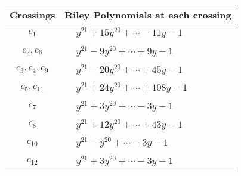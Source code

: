\documentclass[1p]{elsarticle_modified}
\theoremstyle{definition}
\begin{document}
\begin{tabular}{m{50pt}|m{274pt}}
Crossings & \hspace{64pt}Riley Polynomials at each crossing \\
\hline $$\begin{aligned}c_{1}\end{aligned}$$&$\begin{aligned}
&y^{21}+15 y^{20}+\cdots-11 y-1
\end{aligned}$\\
\hline $$\begin{aligned}c_{2},c_{6}\end{aligned}$$&$\begin{aligned}
&y^{21}-9 y^{20}+\cdots+9 y-1
\end{aligned}$\\
\hline $$\begin{aligned}c_{3},c_{4},c_{9}\end{aligned}$$&$\begin{aligned}
&y^{21}-20 y^{20}+\cdots+45 y-1
\end{aligned}$\\
\hline $$\begin{aligned}c_{5},c_{11}\end{aligned}$$&$\begin{aligned}
&y^{21}+24 y^{20}+\cdots+108 y-1
\end{aligned}$\\
\hline $$\begin{aligned}c_{7}\end{aligned}$$&$\begin{aligned}
&y^{21}+3 y^{20}+\cdots-3 y-1
\end{aligned}$\\
\hline $$\begin{aligned}c_{8}\end{aligned}$$&$\begin{aligned}
&y^{21}+12 y^{20}+\cdots+43 y-1
\end{aligned}$\\
\hline $$\begin{aligned}c_{10}\end{aligned}$$&$\begin{aligned}
&y^{21}- y^{20}+\cdots-3 y-1
\end{aligned}$\\
\hline $$\begin{aligned}c_{12}\end{aligned}$$&$\begin{aligned}
&y^{21}+3 y^{20}+\cdots-3 y-1
\end{aligned}$\\
\hline
\end{tabular}\\~\\
\end{document}
